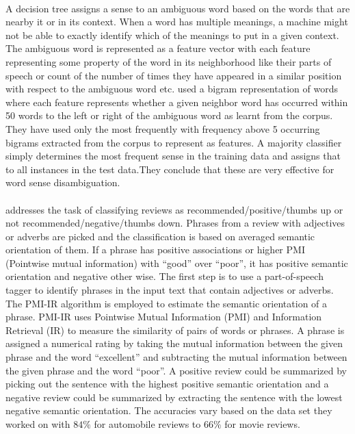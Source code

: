 \documentclass[a4paper,26pt]{article}
\begin{document}
\paragraph{}
A decision tree assigns a sense to an ambiguous word based on the words that are nearby it or in its context. When a word has multiple meanings, a machine might not be able to exactly identify which of the meanings to put in a given context. The ambiguous word is represented as a feature vector with each feature representing some property of the word in its neighborhood like their parts of speech or count of the number of times they have appeared in a similar position with respect to the ambiguous word etc. \cite{pedersen2001decision} used a bigram representation of words where each feature represents whether a given neighbor word has occurred within 50 words to the left or right of the ambiguous word as learnt from the corpus. They have used only the most frequently with frequency above 5 occurring bigrams extracted from the corpus to represent as features. A majority classifier simply determines the most frequent sense in the training data and assigns that to all instances in the test data.They conclude that these are very effective for word sense disambiguation. 

\paragraph{}
\cite{turney2002thumbs} addresses the task of classifying reviews as recommended/positive/thumbs up or not recommended/negative/thumbs down. Phrases from a review with adjectives or adverbs are picked and the classification is based on averaged semantic orientation of them. If a phrase has positive associations or higher PMI (Pointwise mutual information) with ``good'' over ``poor'', it has positive semantic orientation and negative other wise. The first step is to use a part-of-speech tagger to identify phrases in the input text that contain adjectives or adverbs. The PMI-IR algorithm is employed to estimate the semantic orientation of a phrase. PMI-IR uses Pointwise Mutual Information (PMI) and Information Retrieval (IR) to measure the similarity of pairs of words or phrases. A phrase is assigned a numerical rating by taking the mutual information between the given phrase and the word ``excellent'' and subtracting the mutual information between the given phrase and the word ``poor''. A positive review could be summarized by picking out the sentence with the highest positive semantic orientation and a negative review could be summarized by extracting the sentence with the lowest negative semantic orientation. The accuracies vary based on the data set they worked on with $84\%$ for automobile reviews to $66\%$ for movie reviews.
\end{document}
